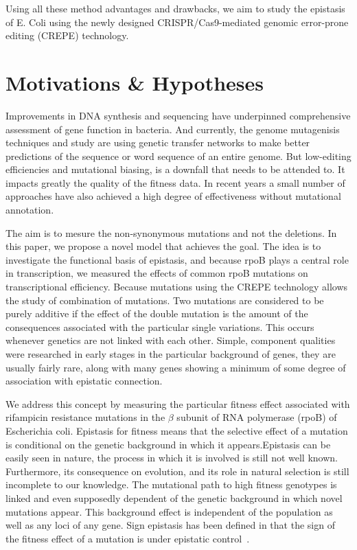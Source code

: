\documentclass[12pt]{article}
\begin{document}
  Using all these method advantages and drawbacks, we aim to study the
  epistasis of E. Coli using the newly designed CRISPR/Cas9-mediated genomic
  error-prone editing (CREPE) technology.

  \section*{Motivations \& Hypotheses}

  Improvements in DNA synthesis and sequencing have underpinned comprehensive
  assessment of gene function in bacteria. And currently, the genome
  mutagenisis techniques and study are using genetic transfer networks to make
  better predictions of the sequence or word sequence of an entire genome. But
  low-editing efficiencies and mutational biasing, is a downfall that needs to
  be attended to. It impacts greatly the quality of the fitness data.  In
  recent years a small number of approaches have also achieved a high degree of
  effectiveness without mutational annotation. 

  The aim is to mesure the non-synonymous mutations and not the deletions.  In
  this paper, we propose a novel model that achieves the goal.  The idea is to
  investigate the functional basis of epistasis, and because rpoB plays a
  central role in transcription, we measured the effects of common rpoB
  mutations on transcriptional efficiency. Because mutations using the CREPE
  technology allows the study of combination of mutations. Two mutations are
  considered to be purely additive if the effect of the double mutation is the
  amount of the consequences associated with the particular single variations.
  This occurs whenever genetics are not linked with each other. Simple,
  component qualities were researched in early stages in the particular
  background of genes, they are usually fairly rare, along with many genes
  showing a minimum of some degree of association with epistatic connection.

  We address this concept by measuring the particular fitness effect associated
  with rifampicin resistance mutations in the $\beta$ subunit of RNA polymerase
  (rpoB) of Escherichia coli.  Epistasis for fitness means that the selective
  effect of a mutation is conditional on the genetic background in which it
  appears.Epistasis can be easily seen in nature, the process in which it is
  involved is still not well known. Furthermore, its consequence on evolution,
  and its role in natural selection is still incomplete to our knowledge. The
  mutational path to high fitness genotypes is linked and even supposedly
  dependent of the genetic background in which novel mutations appear. This
  background effect is independent of the population as well as any loci of any
  gene. Sign epistasis has been defined in that the sign of the fitness effect
  of a mutation is under epistatic control~\cite{garst2017genome}. 
\end{document}

